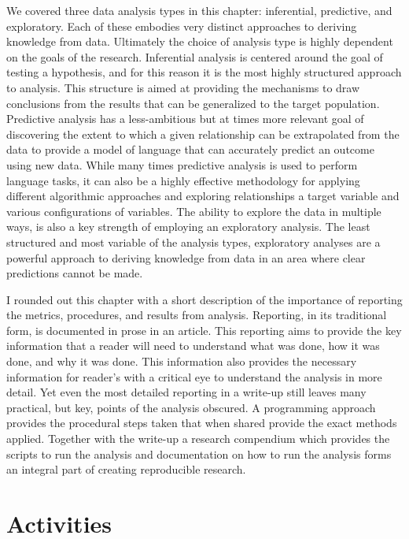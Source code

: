 \documentclass[
  letterpaper,
]{scrbook}
\begin{document}
We covered three data analysis types in this chapter: inferential,
predictive, and exploratory. Each of these embodies very distinct
approaches to deriving knowledge from data. Ultimately the choice of
analysis type is highly dependent on the goals of the research.
Inferential analysis is centered around the goal of testing a
hypothesis, and for this reason it is the most highly structured
approach to analysis. This structure is aimed at providing the
mechanisms to draw conclusions from the results that can be generalized
to the target population. Predictive analysis has a less-ambitious but
at times more relevant goal of discovering the extent to which a given
relationship can be extrapolated from the data to provide a model of
language that can accurately predict an outcome using new data. While
many times predictive analysis is used to perform language tasks, it can
also be a highly effective methodology for applying different
algorithmic approaches and exploring relationships a target variable and
various configurations of variables. The ability to explore the data in
multiple ways, is also a key strength of employing an exploratory
analysis. The least structured and most variable of the analysis types,
exploratory analyses are a powerful approach to deriving knowledge from
data in an area where clear predictions cannot be made.

I rounded out this chapter with a short description of the importance of
reporting the metrics, procedures, and results from analysis. Reporting,
in its traditional form, is documented in prose in an article. This
reporting aims to provide the key information that a reader will need to
understand what was done, how it was done, and why it was done. This
information also provides the necessary information for reader's with a
critical eye to understand the analysis in more detail. Yet even the
most detailed reporting in a write-up still leaves many practical, but
key, points of the analysis obscured. A programming approach provides
the procedural steps taken that when shared provide the exact methods
applied. Together with the write-up a research compendium which provides
the scripts to run the analysis and documentation on how to run the
analysis forms an integral part of creating reproducible research.

\hypertarget{activities-2}{%
\section*{Activities}\label{activities-2}}
\end{document}
